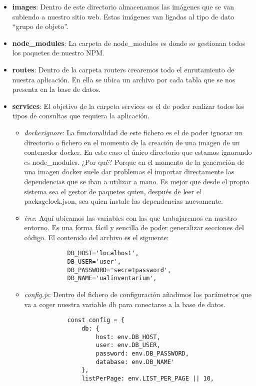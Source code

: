\begin{itemize}
    \item \textbf{images}: Dentro de este directorio almacenamos las imágenes que se van subiendo a nuestro sitio web. Estas imágenes van ligadas al tipo de dato ``grupo de objeto''.
    \item \textbf{node\_modules}: La carpeta de node\_modules es donde se gestionan todos los paquetes de nuestro NPM.
    \item \textbf{routes}: Dentro de la carpeta routers crearemos todo el enrutamiento de nuestra aplicación. En ella se ubica un archivo por cada tabla que se nos presenta en la base de datos.
    \item \textbf{services}: El objetivo de la carpeta services es el de poder realizar todos los tipos de consultas que requiera la aplicación.
    \begin{itemize}
        \item \textit{\.dockerignore}: La funcionalidad de este fichero es el de poder ignorar un directorio o fichero en el momento de la creación de una imagen de un contenedor docker. En este caso el único directorio que estamos ignorando es node\_modules. ¿Por qué? Porque en el momento de la generación de una imagen docker suele dar problemas el importar directamente las dependencias que se iban a utilizar a mano. Es mejor que desde el propio sistema sea el gestor de paquetes quien, después de leer el package\-lock.json, sea quien instale las dependencias nuevamente.
        \item \textit{\.env}: Aquí ubicamos las variables con las que trabajaremos en nuestro entorno. Es una forma fácil y sencilla de poder generalizar secciones del código. El contenido del archivo es el siguiente:
        \begin{verbatim}
            DB_HOST='localhost',
            DB_USER='user',
            DB_PASSWORD='secretpassword',
            DB_NAME='ualinventarium',
        \end{verbatim}
        \item \textit{config.js}: Dentro del fichero de configuración añadimos los parámetros que va a coger nuestra variable db para conectarse a la base de datos.
        \begin{verbatim}
            const config = {
                db: {
                    host: env.DB_HOST,
                    user: env.DB_USER,
                    password: env.DB_PASSWORD,
                    database: env.DB_NAME'
                },
                listPerPage: env.LIST_PER_PAGE || 10,

\end{verbatim}
\end{itemize}
\end{itemize}
